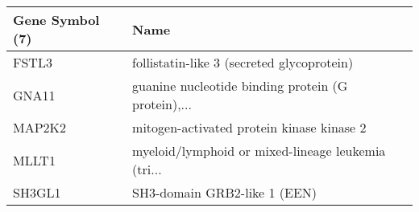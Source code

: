 \begin{tabular}{ll}
\toprule
Gene Symbol (7) &                                               Name \\
\midrule
          FSTL3 &         follistatin-like 3 (secreted glycoprotein) \\
          GNA11 & guanine nucleotide binding protein (G protein),... \\
         MAP2K2 &          mitogen-activated protein kinase kinase 2 \\
          MLLT1 & myeloid/lymphoid or mixed-lineage leukemia (tri... \\
         SH3GL1 &                       SH3-domain GRB2-like 1 (EEN) \\
\bottomrule
\end{tabular}
